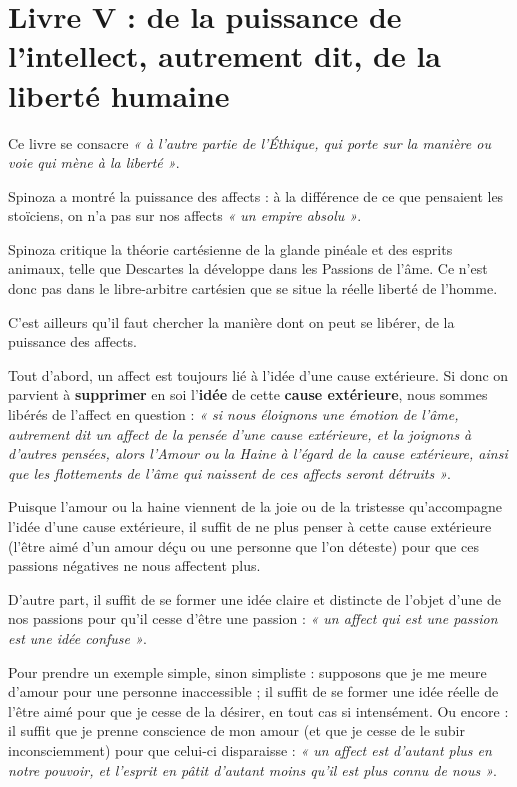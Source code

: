 

\section{Livre V : de la puissance de l’intellect, autrement dit, de la liberté
humaine}

Ce livre se consacre {\it « à l’autre partie de l’Éthique, qui porte sur la
manière ou voie qui mène à la liberté »}.

\vspace{0.5cm}
Spinoza a montré la puissance des affects : à la différence de ce que pensaient
les stoïciens, on n’a pas sur nos affects {\it « un empire absolu »}.

Spinoza critique la théorie cartésienne de la glande pinéale et des esprits
animaux, telle que Descartes la développe dans les Passions de l’âme. Ce n’est
donc pas dans le libre-arbitre cartésien que se situe la réelle liberté de l’homme.

C’est ailleurs qu’il faut chercher la manière dont on peut se libérer, de la
puissance des affects.

\vspace{0.5cm}
Tout d’abord, un affect est toujours lié à l’idée d’une cause extérieure. Si
donc on parvient à {\bf supprimer} en soi l’{\bf idée} de cette {\bf cause extérieure}, nous
sommes libérés de l’affect en question : {\it « si nous éloignons une émotion de
l’âme, autrement dit un affect de la pensée d’une cause extérieure, et la
joignons à d’autres pensées, alors l’Amour ou la Haine à l’égard de la cause
extérieure, ainsi que les flottements de l’âme qui naissent de ces affects
seront détruits »}.

Puisque l’amour ou la haine viennent de la joie ou de la tristesse
qu’accompagne l’idée d’une cause extérieure, il suffit de ne plus penser à
cette cause extérieure (l’être aimé d’un amour déçu ou une personne que
l’on déteste) pour que ces passions négatives ne nous affectent plus.

\vspace{0.5cm}
D’autre part, il suffit de se former une idée claire et distincte de l’objet
d’une de nos passions pour qu’il cesse d’être une passion : {\it « un affect qui est
une passion est une idée confuse »}.

Pour prendre un exemple simple, sinon simpliste : supposons que je me meure
d’amour pour une personne inaccessible ; il suffit de se former une idée réelle
de l’être aimé pour que je cesse de la désirer, en tout cas si intensément.
Ou encore : il suffit que je prenne conscience de mon amour (et que je cesse
de le subir inconsciemment) pour que celui-ci disparaisse : {\it « un affect est
d’autant plus en notre pouvoir, et l’esprit en pâtit d’autant moins qu’il est
plus connu de nous »}.


